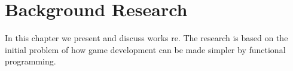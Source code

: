 \chapter{Background Research} \label{chap:background-research}
In this chapter we present and discuss works re. The research is based on the initial problem of how game development can be made simpler by functional programming.






